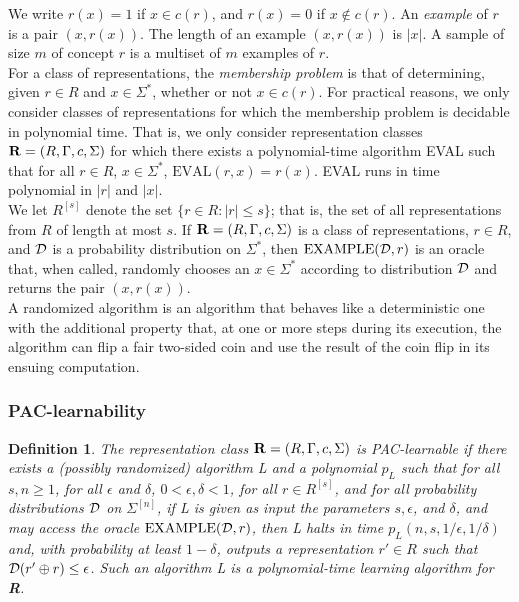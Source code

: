\documentclass[12pt]{article}
\newtheorem{definition}[theorem]{Definition}
\newcommand{\cald}{{\cal D}}
\begin{document}
We write $r(x) = 1$ if $x \in c(r)$, and $r(x) = 0$ if $x \notin c(r)$. An \emph {example} of $r$ is a pair $(x, r(x))$. The length of an example $(x, r(x))$ is $|x|$. A sample of size $m$ of concept $r$ is a multiset of $m$ examples of $r$. \\

For a class of representations, the \emph {membership problem} is that of determining, given $r \in R$ and $x \in \Sigma^*$, whether or not $x \in c(r)$. For practical reasons, we only consider classes of representations for which the membership problem is decidable in polynomial time. That is, we only consider representation classes ${\bf R} = (R, \Gamma, c, \Sigma)$ for which there exists a polynomial-time algorithm EVAL such that for all $r \in R$, $x \in \Sigma^*$, $\text {EVAL}(r, x) = r(x)$. EVAL runs in time polynomial in $|r|$ and $|x|$. \\

We let $R^{[s]}$ denote the set $\{ r \in R: |r| \le s\}$; that is, the set of all representations from $R$ of length at most $s$. If ${\bf R} = (R, \Gamma, c, \Sigma)$ is a class of representations, $r \in R$, and $\cald$ is a probability distribution on $\Sigma^*$, then $\text{EXAMPLE}(\cald, r)$ is an oracle that, when called, randomly chooses an $x \in \Sigma^*$ according to distribution $\cald$ and returns the pair $(x, r(x))$. \\

A randomized algorithm is an algorithm that behaves like a deterministic one with the additional property that, at one or more steps during its execution, the algorithm can flip a fair two-sided coin and use the result of the coin flip in its ensuing computation.

\subsubsection{PAC-learnability}

\begin{definition}
The representation class ${\bf R} = (R, \Gamma, c, \Sigma)$ is PAC-\emph {learnable} if there exists a (possibly randomized) algorithm L and a polynomial $p_L$ such that for all $s, n \ge 1$, for all $\epsilon$ and $\delta$, $0 < \epsilon, \delta < 1$, for all $r \in R^{[s]}$, and for all probability distributions $\cald$ on $\Sigma^{[n]}$, if L is given as input the parameters $s, \epsilon$, and $\delta$, and may access the oracle $\text {EXAMPLE}(\cald, r)$, then L halts in time $p_L(n, s, 1/\epsilon, 1/\delta)$ and, with probability at least $1 - \delta$, outputs a representation $r' \in R$ such that $\cald (r' \oplus r) \le \epsilon$. Such an algorithm L is a polynomial-time learning algorithm for {\bf R}.
\end{definition}
\end{document}
